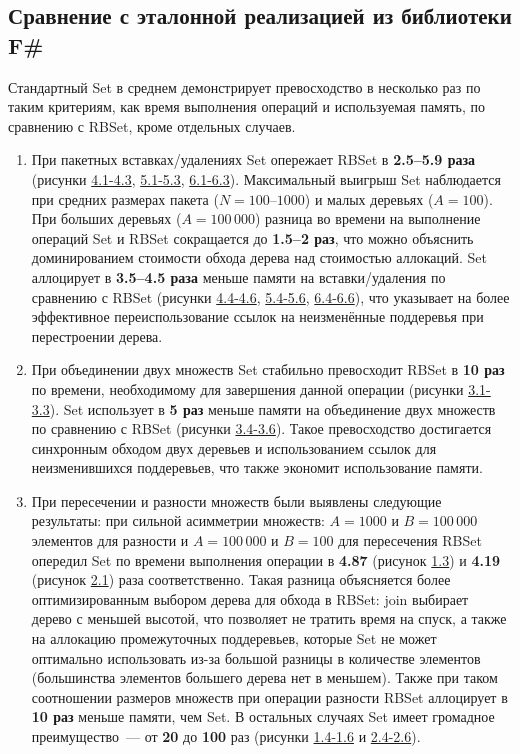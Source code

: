 \documentclass[a4paper]{article}
\begin{document}
\subsection{Сравнение с эталонной реализацией из библиотеки F\#}
Стандартный Set в среднем демонстрирует превосходство в несколько раз по таким критериям, как время выполнения операций и используемая память, 
по сравнению с RBSet, кроме отдельных случаев.
\begin{enumerate}
    \item При пакетных вставках/удалениях Set опережает RBSet в \textbf{2.5--5.9 раза} (рисунки \href{images.pdf#page=7}{4.1-4.3}, 
          \href{images.pdf#page=9}{5.1-5.3}, \href{images.pdf#page=11}{6.1-6.3}).
          Максимальный выигрыш Set наблюдается при средних размерах
          пакета ($N = 100$--$1000$) и малых деревьях ($A = 100$).
          При больших деревьях ($A = 100\,000$) разница во времени на выполнение 
          операций Set и RBSet сокращается до \textbf{1.5--2 раз}, что можно объяснить 
          доминированием стоимости обхода дерева над стоимостью аллокаций.
          Set аллоцирует в \textbf{3.5--4.5 раза}
          меньше памяти на вставки/удаления по сравнению с RBSet (рисунки \href{images.pdf#page=8}{4.4-4.6}, 
          \href{images.pdf#page=10}{5.4-5.6}, \href{images.pdf#page=12}{6.4-6.6}), 
          что указывает на более эффективное переиспользование ссылок на неизменённые поддеревья при перестроении дерева.
    \item При объединении двух множеств Set стабильно превосходит RBSet в \textbf{10 раз} по времени, необходимому для 
          завершения данной операции (рисунки \href{images.pdf#page=5}{3.1-3.3}).
          Set использует в \textbf{5 раз} меньше памяти на объединение двух множеств по сравнению с RBSet (рисунки \href{images.pdf#page=6}{3.4-3.6}).
          Такое превосходство достигается синхронным обходом двух деревьев и использованием ссылок для неизменившихся поддеревьев, 
          что также экономит использование памяти.
    \item При пересечении и разности множеств были выявлены следующие результаты: 
          при сильной асимметрии множеств: $A = 1000$ и $B = 100\,000$ элементов для разности и 
           $A = 100\,000$ и $B = 100$ для пересечения RBSet опередил Set по времени выполнения операции в \textbf{4.87} (рисунок \href{images.pdf#page=1}{1.3}) и \textbf{4.19} (рисунок \href{images.pdf#page=3}{2.1}) раза соответственно.
           Такая разница объясняется более оптимизированным выбором дерева для обхода в RBSet: join выбирает дерево с меньшей высотой, что позволяет не тратить 
           время на спуск, а также на аллокацию промежуточных поддеревьев, которые Set не может оптимально использовать из-за большой разницы в количестве 
           элементов (большинства элементов большего дерева нет в меньшем). Также при таком соотношении размеров множеств при операции разности RBSet аллоцирует 
           в \textbf{10 раз} меньше памяти, чем Set. В остальных случаях Set имеет громадное преимущество~--- от \textbf{20} до \textbf{100} раз (рисунки \href{images.pdf#page=2}{1.4-1.6} и \href{images.pdf#page=4}{2.4-2.6}).
\end{enumerate}  
\end{document}
